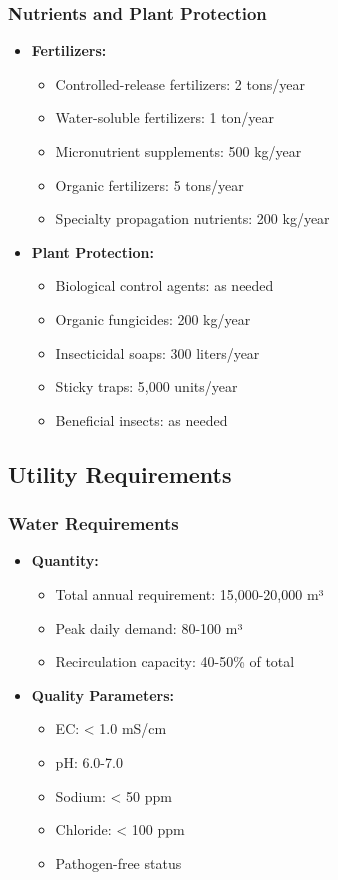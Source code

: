 \subsubsection{Nutrients and Plant Protection}
\begin{itemize}
    \item \textbf{Fertilizers:}
    \begin{itemize}
        \item Controlled-release fertilizers: 2 tons/year
        \item Water-soluble fertilizers: 1 ton/year
        \item Micronutrient supplements: 500 kg/year
        \item Organic fertilizers: 5 tons/year
        \item Specialty propagation nutrients: 200 kg/year
    \end{itemize}
    
    \item \textbf{Plant Protection:}
    \begin{itemize}
        \item Biological control agents: as needed
        \item Organic fungicides: 200 kg/year
        \item Insecticidal soaps: 300 liters/year
        \item Sticky traps: 5,000 units/year
        \item Beneficial insects: as needed
    \end{itemize}
\end{itemize}

\subsection{Utility Requirements}

\subsubsection{Water Requirements}
\begin{itemize}
    \item \textbf{Quantity:}
    \begin{itemize}
        \item Total annual requirement: 15,000-20,000 m³
        \item Peak daily demand: 80-100 m³
        \item Recirculation capacity: 40-50\% of total
    \end{itemize}
    
    \item \textbf{Quality Parameters:}
    \begin{itemize}
        \item EC: < 1.0 mS/cm
        \item pH: 6.0-7.0
        \item Sodium: < 50 ppm
        \item Chloride: < 100 ppm
        \item Pathogen-free status
    \end{itemize}
\end{itemize}

